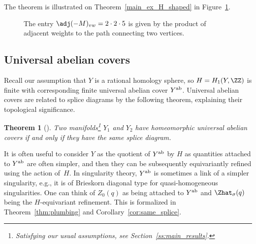 \documentclass[pdftex]{sigma}
\newtheorem{Theorem}{Theorem}[section]
\begin{document}
The theorem is illustrated on Theorem~\ref{main_ex_H_shaped} in Figure~\ref{fig:path}.
	\begin{figure}[ht]
		\centering
		\caption{The entry $\adj(-M)_{vw} = 2 \cdot 2 \cdot 5$ is given by the product of adjacent weights to the path connecting two vertices.}
		\label{fig:path}
	\end{figure}

\subsection{Universal abelian covers}

Recall our assumption that $Y$ is a rational homology sphere, so $H = H_1(Y, \ZZ)$ is finite with corresponding finite universal abelian cover $Y^{\rm ab}$. Universal abelian covers are related to splice diagrams by the following theorem, explaining their topological significance.

\begin{Theorem}[\cite{NW05a, Pe09}]\label{thm:ab_cover}
	Two manifolds\footnote{Satisfying our usual assumptions, see Section~\ref{ss:main_results}.} $Y_1$ and $Y_2$ have homeomorphic universal abelian covers if and only if they have the same splice diagram.
\end{Theorem}

It is often useful to consider $Y$ as the quotient of $Y^{\rm ab}$ by $H$ as quantities attached to $Y^{\rm ab}$ are often simpler, and then they can be subsequently equivariantly refined using the action of~$H$. In singularity theory, $Y^{\rm ab}$ is sometimes a link of a simpler singularity, e.g., it is of Brieskorn diagonal type for quasi-homogeneous singularities. One can think of $Z_0(q)$ as being attached to $Y^{\rm ab}$ and $\Zhat_\sigma(q)$ being the $H$-equivariant refinement. This is formalized in Theorem~\ref{thm:plumbing} and Corollary~\ref{cor:same_splice}.
\end{document}
